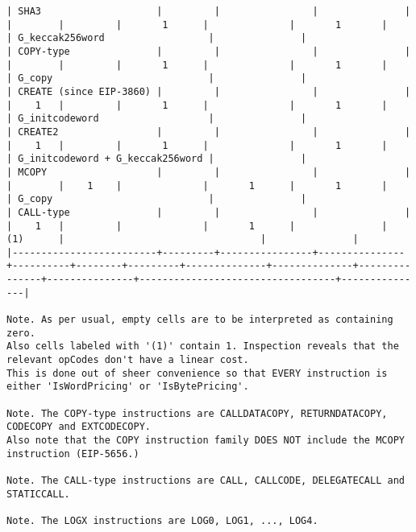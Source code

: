 \documentclass[varwidth=\maxdimen,margin=0.5cm,multi={verbatim}]{standalone}
\begin{document}
\begin{verbatim}
| SHA3                    |         |                |               |          |        |         |       1      |              |       1       |               | G_keccak256word                  |               |
| COPY-type               |         |                |               |          |        |         |       1      |              |       1       |               | G_copy                           |               |
| CREATE (since EIP-3860) |         |                |               |          |    1   |         |       1      |              |       1       |               | G_initcodeword                   |               |
| CREATE2                 |         |                |               |          |    1   |         |       1      |              |       1       |               | G_initcodeword + G_keccak256word |               |
| MCOPY                   |         |                |               |          |        |    1    |              |       1      |       1       |               | G_copy                           |               |
| CALL-type               |         |                |               |          |    1   |         |              |       1      |               |      (1)      |                                  |               |
|-------------------------+---------+----------------+---------------+----------+--------+---------+--------------+--------------+---------------+---------------+----------------------------------+---------------|

Note. As per usual, empty cells are to be interpreted as containing zero.
Also cells labeled with '(1)' contain 1. Inspection reveals that the relevant opCodes don't have a linear cost.
This is done out of sheer convenience so that EVERY instruction is either 'IsWordPricing' or 'IsBytePricing'.

Note. The COPY-type instructions are CALLDATACOPY, RETURNDATACOPY, CODECOPY and EXTCODECOPY.
Also note that the COPY instruction family DOES NOT include the MCOPY instruction (EIP-5656.)

Note. The CALL-type instructions are CALL, CALLCODE, DELEGATECALL and STATICCALL.

Note. The LOGX instructions are LOG0, LOG1, ..., LOG4.

\end{verbatim}
\end{document}
